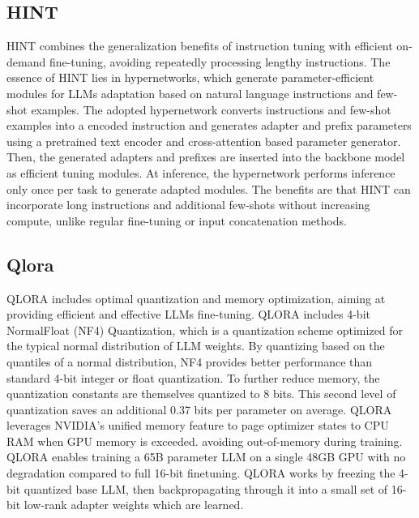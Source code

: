 \documentclass[11pt]{article}
\begin{document}
    \subsection{HINT}
HINT \cite{Ivison2022HINTHI} combines the generalization benefits of instruction tuning with efficient on-demand fine-tuning, avoiding repeatedly processing lengthy instructions.
The essence of HINT lies in hypernetworks, which generate parameter-efficient modules for LLMs adaptation based on natural language instructions and few-shot examples. The adopted hypernetwork converts instructions and few-shot examples into a encoded instruction and generates adapter and prefix parameters using a pretrained text encoder and cross-attention based parameter generator. Then, the generated adapters and prefixes are inserted into the backbone model as efficient tuning modules. At inference, the hypernetwork performs inference only once per task to generate adapted modules.
The benefits are that HINT can incorporate long instructions and additional few-shots without increasing compute, unlike regular fine-tuning or input concatenation methods.
    \subsection{Qlora}
QLORA \cite{dettmers2023qlora} includes optimal quantization and memory optimization, aiming at providing efficient and effective LLMs fine-tuning.
QLORA includes 4-bit NormalFloat (NF4) Quantization, which is a quantization scheme optimized for the typical normal distribution of LLM weights. By quantizing based on the quantiles of a normal distribution, NF4 provides better performance than standard 4-bit integer or float quantization. To further reduce memory, the quantization constants are themselves quantized to 8 bits. This second level of quantization saves an additional 0.37 bits per parameter on average. QLORA leverages NVIDIA's unified memory feature to page optimizer states to CPU RAM when GPU memory is exceeded. avoiding out-of-memory during training.
QLORA enables training a 65B parameter LLM on a single 48GB GPU with no degradation compared to full 16-bit finetuning. QLORA works by freezing the 4-bit quantized base LLM, then backpropagating through it into a small set of 16-bit low-rank adapter weights which are learned.
\end{document}

